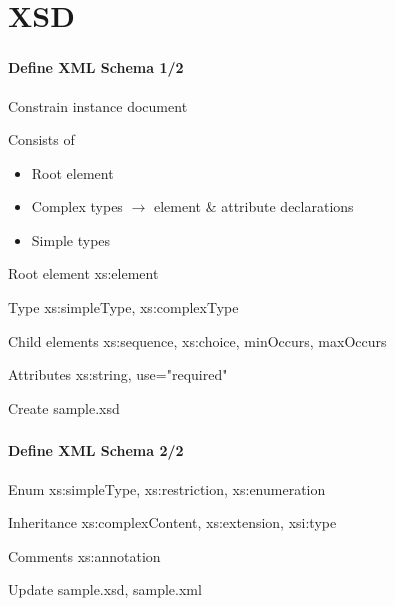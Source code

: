 \documentclass[handout]{beamer}
\begin{document}
\section{XSD}
\begin{frame}
	\frametitle{\insertsection}
	\framesubtitle{Define XML Schema 1/2}
	Constrain instance document
	\begin{block}{Consists of}
		\begin{itemize}
			\item Root element
			\item Complex types $\rightarrow$ element \& attribute declarations
			\item Simple types
		\end{itemize}
	\end{block}
	\begin{block}{Root element}
		xs:element
	\end{block}
	\begin{block}{Type}
		xs:simpleType,
		xs:complexType
	\end{block}
	\begin{block}{Child elements}
		xs:sequence,
		xs:choice,
		minOccurs,
		maxOccurs
	\end{block}
	\begin{block}{Attributes}
		xs:string, use="required"
	\end{block}
	\begin{semiverbatim}
		Create sample.xsd
	\end{semiverbatim}
\end{frame}

\begin{frame}
	\frametitle{\insertsection}
	\framesubtitle{Define XML Schema 2/2}
	\begin{block}{Enum}
		xs:simpleType,
		xs:restriction,
		xs:enumeration
	\end{block}
	\begin{block}{Inheritance}
		xs:complexContent,
		xs:extension,
		xsi:type
	\end{block}
	\begin{block}{Comments}
		xs:annotation
	\end{block}
	\begin{semiverbatim}
		Update sample.xsd, sample.xml
	\end{semiverbatim}
\end{frame}

\end{document}
